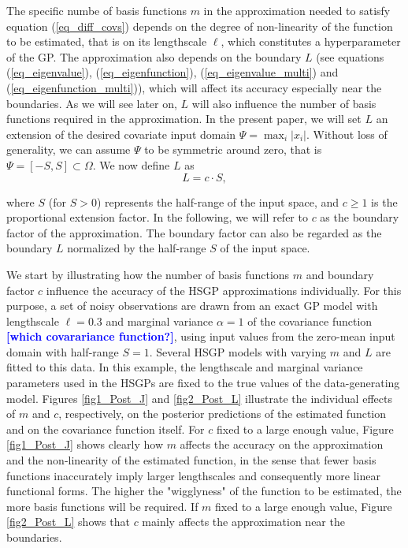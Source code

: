\documentclass[onecolumn,a4paper,11pt]{article}
\newcommand{\todo}[1]{\textcolor{blue}{\textbf{[#1]}}}
\begin{document}
The specific numbe of basis functions  $m$ in the approximation needed to satisfy equation (\ref{eq_diff_covs}) depends on the degree of non-linearity of the function to be estimated, that is on its lengthscale $\ell$, which constitutes a hyperparameter of the GP. The approximation also depends on the boundary $L$ (see equations (\ref{eq_eigenvalue}), (\ref{eq_eigenfunction}), (\ref{eq_eigenvalue_multi}) and (\ref{eq_eigenfunction_multi})), which will affect its accuracy especially near the boundaries. As we will see later on, $L$ will also influence the number of basis functions required in the approximation. In the present paper, we will set $L$ an extension of the desired covariate input domain $\Psi = \max_{i}|x_i|$. Without loss of generality, we can assume $\Psi$ to be symmetric around zero, that is $\Psi=[-S,S] \subset \Omega$. We now define $L$ as
%
\begin{equation}\label{eq_boundary}
L=c \cdot S,
\end{equation} 

\noindent where $S$ (for $S > 0$) represents the half-range of the input space, and $c \geq 1$ is the proportional extension factor. In the following, we will refer to $c$ as the boundary factor of the approximation. The boundary factor can also be regarded as the boundary $L$ normalized by the half-range $S$ of the input space.

We start by illustrating how the number of basis functions $m$ and boundary factor $c$ influence the accuracy of the HSGP approximations individually. For this purpose, a set of noisy observations are drawn from an exact GP model with lengthscale $\ell=0.3$ and marginal variance $\alpha=1$ of the covariance function \todo{which covarariance function?}, using input values from the zero-mean input domain with half-range $S=1$. Several HSGP models with varying $m$ and $L$ are fitted to this data. In this example, the lengthscale and marginal variance parameters used in the HSGPs are fixed to the true values of the data-generating model. 
Figures \ref{fig1_Post_J} and \ref{fig2_Post_L} illustrate the individual effects of $m$ and $c$, respectively, on the posterior predictions of the estimated function and on the covariance function itself. For $c$ fixed to a large enough value, Figure \ref{fig1_Post_J} shows clearly how $m$ affects the accuracy on the approximation and the non-linearity of the estimated function, in the sense that fewer basis functions inaccurately imply larger lengthscales and consequently more linear functional forms.
The higher the "wigglyness" of the function to be estimated, the more basis functions will be required. If $m$ fixed to a large enough value, Figure \ref{fig2_Post_L} shows that $c$ mainly affects the approximation near the boundaries. 
\end{document}
